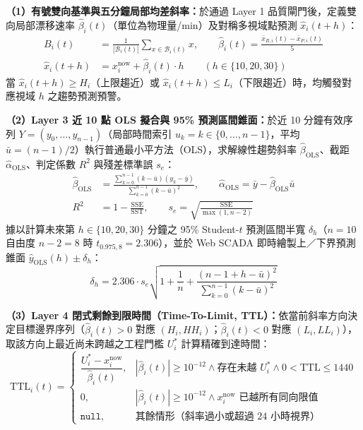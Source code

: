 \documentclass[fontset=none, a4paper, 12pt]{ctexart}
\begin{document}
\begin{doublespace}
\textbf{（1）有號雙向基準與五分鐘局部均差斜率：}於通過 Layer 1 品質閘門後，定義雙向局部漂移速率 $\hat{\beta}_i(t)$（單位為物理量/min）及對稱多視域點預測 $\hat{x}_i(t+h)$：
\begin{align}
B_i(t) &= \frac{1}{|\mathcal{B}_i(t)|}\sum_{x\in\mathcal{B}_i(t)} x, \qquad
\hat{\beta}_i(t) = \frac{\bar{x}_{R,i}(t) - \bar{x}_{P,i}(t)}{5} \nonumber \\
\hat{x}_i(t+h) &= x_i^{\mathrm{now}} + \hat{\beta}_i(t)\cdot h \qquad (h\in\{10,20,30\})
\label{eq:base_slope}
\end{align}
當 $\hat{x}_i(t+h) \ge H_i$（上限趨近）或 $\hat{x}_i(t+h) \le L_i$（下限趨近）時，均觸發對應視域 $h$ 之趨勢預測預警。

\textbf{（2）Layer 3 近 10 點 OLS 擬合與 95\% 預測區間錐面：}於近 10 分鐘有效序列 $Y = (y_0, \dots, y_{n-1})$（局部時間索引 $u_k = k \in \{0,\dots,n-1\}$，平均 $\bar{u}=(n-1)/2$）執行普通最小平方法（OLS），求解線性趨勢斜率 $\hat{\beta}_{\mathrm{OLS}}$、截距 $\hat{\alpha}_{\mathrm{OLS}}$、判定係數 $R^2$ 與殘差標準誤 $s_e$：
\begin{align}
\hat{\beta}_{\mathrm{OLS}} &= \frac{\sum_{k=0}^{n-1}(k-\bar{u})(y_k-\bar{y})}{\sum_{k=0}^{n-1}(k-\bar{u})^2}, \qquad
\hat{\alpha}_{\mathrm{OLS}} = \bar{y} - \hat{\beta}_{\mathrm{OLS}}\bar{u} \nonumber \\
R^2 &= 1 - \frac{\mathrm{SSE}}{\mathrm{SST}}, \qquad
s_e = \sqrt{\frac{\mathrm{SSE}}{\max(1, n-2)}}
\label{eq:ols_fit}
\end{align}
據以計算未來第 $h \in \{10, 20, 30\}$ 分鐘之 95\% Student-$t$ 預測區間半寬 $\delta_h$（$n=10$ 自由度 $n-2=8$ 時 $t_{0.975,8}=2.306$），並於 Web SCADA 即時繪製上／下界預測錐面 $\hat{y}_{\mathrm{OLS}}(h) \pm \delta_h$：
\begin{equation}
\delta_h = 2.306 \cdot s_e \sqrt{1 + \frac{1}{n} + \frac{(n - 1 + h - \bar{u})^2}{\sum_{k=0}^{n-1}(k-\bar{u})^2}}
\label{eq:pred_band}
\end{equation}

\textbf{（3）Layer 4 閉式剩餘到限時間（Time-To-Limit, TTL）：}依當前斜率方向決定目標邊界序列（$\hat{\beta}_i(t)>0$ 對應 $(H_i, HH_i)$；$\hat{\beta}_i(t)<0$ 對應 $(L_i, LL_i)$），取該方向上最近尚未跨越之工程門檻 $U_i^*$ 計算精確到達時間：
\begin{equation}
\mathrm{TTL}_i(t) = \begin{cases}
\dfrac{U_i^* - x_i^{\mathrm{now}}}{\hat{\beta}_i(t)}, & |\hat{\beta}_i(t)| \ge 10^{-12} \land \text{存在未越 } U_i^* \land 0 < \mathrm{TTL} \le 1440 \\[8pt]
0, & |\hat{\beta}_i(t)| \ge 10^{-12} \land x_i^{\mathrm{now}} \text{ 已越所有同向限值} \\
\texttt{null}, & \text{其餘情形（斜率過小或超過 24 小時視界）}
\end{cases}
\label{eq:ttl}
\end{equation}


\end{doublespace}
\end{document}
